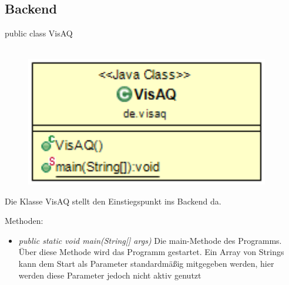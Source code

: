 \clearpage %
\subsection{Backend}
public class VisAQ
\\\\
\begin{minipage}{0.3\textwidth}
    \begin{figure}[H]
        {\centering\includegraphics[width=0.95\textwidth]{media/backend/classes/VisAQ.png}}
    \end{figure}
    \end{minipage} \hfill
\begin{minipage}{0.7\textwidth}
    Die Klasse VisAQ stellt den Einstiegspunkt ins Backend da.
\end{minipage}

Methoden:
\begin{itemize}
    \item \emph{public static void main(String[] args)} Die main-Methode des Programms.
    Über diese Methode wird das Programm gestartet. Ein Array von Strings kann dem Start als Parameter standardmäßig mitgegeben werden, hier werden diese Parameter jedoch nicht aktiv genutzt
\end{itemize}


